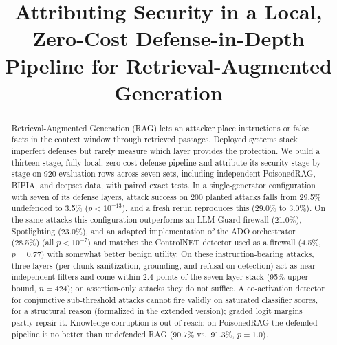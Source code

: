 \documentclass[conference,a4paper]{IEEEtran}
\begin{document}
\title{Attributing Security in a Local, Zero-Cost Defense-in-Depth Pipeline for Retrieval-Augmented Generation}

\author{
}

\maketitle

\begin{abstract}
Retrieval-Augmented Generation (RAG) lets an attacker place instructions or false facts in the context window through retrieved passages. Deployed systems stack imperfect defenses but rarely measure which layer provides the protection. We build a thirteen-stage, fully local, zero-cost defense pipeline and attribute its security stage by stage on 920 evaluation rows across seven sets, including independent PoisonedRAG, BIPIA, and deepset data, with paired exact tests. In a single-generator configuration with seven of its defense layers, attack success on 200 planted attacks falls from 29.5\% undefended to 3.5\% ($p<10^{-13}$), and a fresh rerun reproduces this (29.0\% to 3.0\%). On the same attacks this configuration outperforms an LLM-Guard firewall (21.0\%), Spotlighting (23.0\%), and an adapted implementation of the ADO orchestrator (28.5\%) (all $p<10^{-7}$) and matches the ControlNET detector used as a firewall (4.5\%, $p=0.77$) with somewhat better benign utility. On these instruction-bearing attacks, three layers (per-chunk sanitization, grounding, and refusal on detection) act as near-independent filters and come within 2.4 points of the seven-layer stack (95\% upper bound, $n=424$); on assertion-only attacks they do not suffice. A co-activation detector for conjunctive sub-threshold attacks cannot fire validly on saturated classifier scores, for a structural reason (formalized in the extended version); graded logit margins partly repair it. Knowledge corruption is out of reach: on PoisonedRAG the defended pipeline is no better than undefended RAG (90.7\% vs.\ 91.3\%, $p=1.0$).
\end{abstract}
\end{document}
